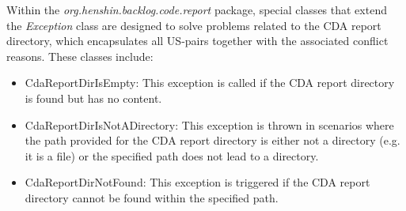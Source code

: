 Within the \textit{org.henshin.backlog.code.report} package, special classes that extend the \textit{Exception} class are designed to solve problems related to the CDA report directory, which encapsulates all US-pairs together with the associated conflict reasons. These classes include:
\begin{itemize}
	\item CdaReportDirIsEmpty: This exception is called if the CDA report directory is found but has no content.
	\item CdaReportDirIsNotADirectory: This exception is thrown in scenarios where the path provided for the CDA report directory is either not a directory (e.g. it is a file) or the specified path does not lead to a directory.
	\item CdaReportDirNotFound: This exception is triggered if the CDA report directory cannot be found within the specified path.
\end{itemize}
